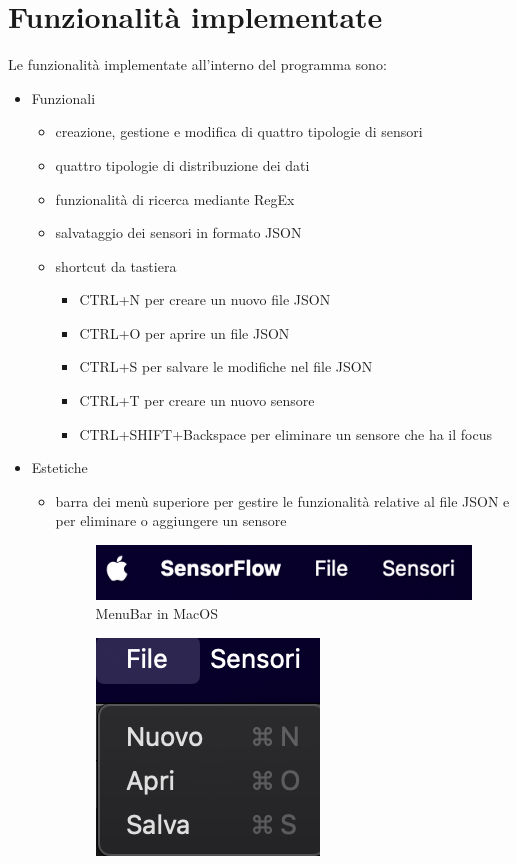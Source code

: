 \documentclass[a4paper, 12pt]{article}
\begin{document}
    \section{Funzionalità implementate}
    Le funzionalità implementate all'interno del programma sono:
    \begin{itemize}
        \item Funzionali
        \begin{itemize}
            \item creazione, gestione e modifica di quattro tipologie di sensori
            \item quattro tipologie di distribuzione dei dati
            \item funzionalità di ricerca mediante RegEx
            \item salvataggio dei sensori in formato JSON
            \item shortcut da tastiera
            \begin{itemize}
                \item CTRL+N per creare un nuovo file JSON
                \item CTRL+O per aprire un file JSON
                \item CTRL+S per salvare le modifiche nel file JSON
                \item CTRL+T per creare un nuovo sensore
                \item CTRL+SHIFT+Backspace per eliminare un sensore che ha il focus
            \end{itemize}
        \end{itemize}
        \item Estetiche
        \begin{itemize}
            \item barra dei menù superiore per gestire le funzionalità relative al file JSON e per eliminare o aggiungere un sensore
            \begin{figure}[H]
                \centering
                \includegraphics[scale=0.7]{assets/Menu.png}
                \caption{MenuBar in MacOS}
            \end{figure}
            \begin{figure}[H]
                \centering
                \includegraphics[scale=0.7]{assets/File.png}

\end{figure}
\end{itemize}
\end{itemize}
\end{document}
